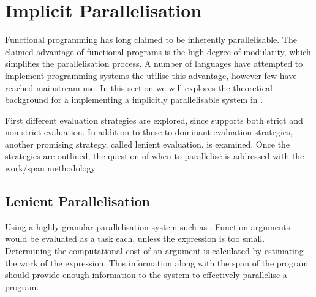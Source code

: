 \section{Implicit Parallelisation}
Functional programming has long claimed to be inherently parallelisable\cite{hudak1986functional, loidl1998granularity}. The claimed advantage of functional programs is the high degree of modularity, which simplifies the parallelisation process. A number of languages have attempted to implement programming systems the utilise this advantage, however few have reached mainstream use. In this section we will explores the theoretical background for a implementing a implicitly parallelisable system in \fs.

First different evaluation strategies are explored, since \fs supports both strict and non-strict evaluation. In addition to these to dominant evaluation strategies, another promising strategy, called lenient evaluation, is examined. Once the strategies are outlined, the question of when to parallelise is addressed with the work/span methodology.




\subsection{Lenient Parallelisation}
Using a highly granular parallelisation system such as  . Function arguments would be evaluated as a task each, unless the expression is too small. Determining the computational cost of an argument is calculated by estimating the work of the expression. This information along with the span of the program should provide enough information to the system to effectively parallelise a \fs program.
